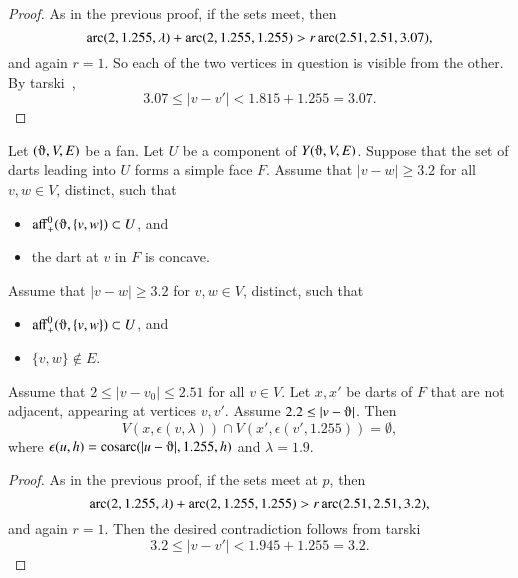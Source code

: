 \begin{proof}
As in the previous proof, if the sets meet, then
    $$\operatorname{arc}(2,1.255,\lambda) +\operatorname{arc}(2,1.255,1.255) > r \operatorname{arc}(2.51,2.51,3.07),$$
and again $r=1$.  So each of the two vertices in question is visible
from the other. By tarski~, 
$$
3.07 \le |v-v'| < 1.815 + 1.255 = 3.07.
$$
\end{proof}

\begin{lemma}
Let $(\orgn,V,E)$ be a fan.  Let $U$ be a component of $Y(\orgn,V,E)$.
Suppose that the set of darts leading into $U$ forms a simple face $F$.
Assume that $|v-w|\ge 3.2$ for all $v,w\in V$, distinct, such that
  \begin{itemize}
   \item $\op{aff}_+^0(\orgn,\{v,w\})\subset U$, and
   \item the dart at $v$ in $F$ is concave.
  \end{itemize}
Assume that $|v-w|\ge 3.2$ for $v,w\in V$, distinct, such that
  \begin{itemize}
   \item $\op{aff}_+^0(\orgn,\{v,w\})\subset U$, and
   \item $\{v,w\}\not\in E$.  %
  \end{itemize}
Assume that $2\le |v-v_0|\le 2.51$ for all $v\in V$.
Let $x,x'$ be darts of $F$ that are not adjacent, appearing at vertices
$v,v'$.  Assume $2.2\le |v-\orgn|$.  Then
$$
V(x,\epsilon(v,\lambda))\cap V(x',\epsilon(v',1.255)) = \emptyset,
$$
where $\epsilon(u,h) = \cosarc(|u-\orgn|,1.255,h)$ and $\lambda=1.9$.
\end{lemma}

\begin{proof}
As in the previous proof, if the sets meet at $p$, then
    $$\operatorname{arc}(2,1.255,\lambda) +\operatorname{arc}(2,1.255,1.255) > r \operatorname{arc}(2.51,2.51,3.2),$$
and again $r=1$.  Then the desired contradiction 
follows from tarski
    $$3.2\le |v-v'|<  1.945 + 1.255 = 3.2.$$
\end{proof}






